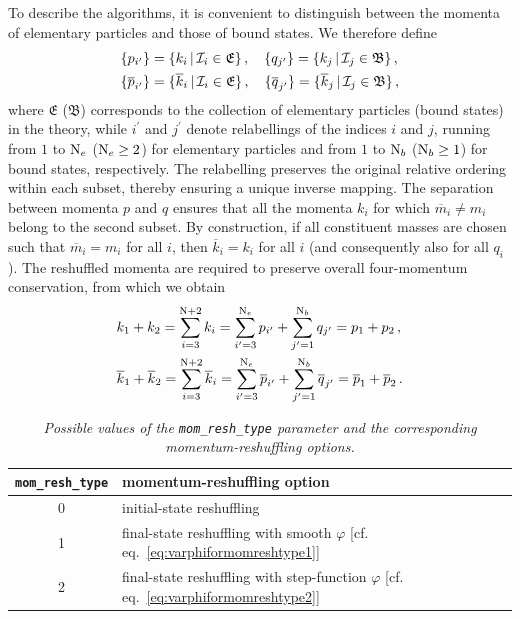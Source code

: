 To describe the algorithms, it is convenient to distinguish between the momenta of elementary particles and those of bound states. We therefore define
\begin{align}
    &\{p_{i^\prime}\} = \{k_i\, \vert\, {\cal I}_i\in \mathfrak{E}\}\,,\quad \{q_{j^\prime}\} = \{k_j\, \vert\, {\cal I}_j\in\mathfrak{B}\}\,,\\
    &\{\overline{p}_{i^\prime}\} = \{\overline{k}_i\, \vert\, {\cal I}_i\in\mathfrak{E}\}\,,\quad \{\overline{q}_{j^\prime}\} = \{\overline{k}_j\, \vert\, {\cal I}_j\in\mathfrak{B}\}\,,
\end{align}
where $\mathfrak{E}$ ($\mathfrak{B}$) corresponds to the collection of elementary particles (bound states) in the theory, while $i^\prime$ and $j^\prime$ denote relabellings of the indices $i$ and $j$, running from $1$ to ${\rm N}_e$ (${\rm N}_e\geq 2$) for elementary particles and from $1$ to ${\rm N}_b$ (${\rm N}_b\geq 1$) for bound states, respectively.
The relabelling preserves the original relative ordering within each subset, thereby ensuring a unique inverse mapping.
The separation between momenta $p$ and $q$ ensures that all the momenta $k_i$ for which $\overline{m}_i \neq m_i$ belong to the second subset. By construction, if all constituent masses are chosen such that $\overline{m}_i = m_i$ for all $i$, then $\overline{k}_i = k_i$ for all $i$ (and consequently also for all $q_i$).
The reshuffled momenta are required to preserve overall four-momentum conservation, from which we obtain
\begin{align}
    &k_1+k_2 = \sum_{i=3}^{{\rm N}+2} k_i = \sum_{i^\prime=3}^{{\rm N}_e} p_{i^\prime} + \sum_{j^\prime=1}^{{\rm N}_b} q_{j^\prime}=p_1+p_2\,,\\
    &\overline{k}_1+\overline{k}_2 = \sum_{i=3}^{{\rm N}+2} \overline{k}_i = \sum_{i^\prime=3}^{{\rm N}_e} \overline{p}_{i^\prime} + \sum_{j^\prime=1}^{{\rm N}_b} \overline{q}_{j^\prime}=\overline{p}_1+\overline{p}_2\,. 
    \label{eq:mom_tilde}
\end{align}

\begin{table}[t]
    \centering
    \begin{tabular}{|c|l|}
    \hline
        {\tt mom\_resh\_type} & momentum-reshuffling option \\
        \hline
        0 & initial-state reshuffling \\
        1 & final-state reshuffling with smooth $\varphi$ [cf. eq.~\eqref{eq:varphiformomreshtype1}] \\
        2 & final-state reshuffling with step-function $\varphi$ [cf. eq.~\eqref{eq:varphiformomreshtype2}] \\\hline
    \end{tabular}
    \caption{\label{tab:momreshuff}\it\small Possible values of the {\tt mom\_resh\_type} 
parameter and the corresponding momentum-reshuffling options.}
\end{table}


